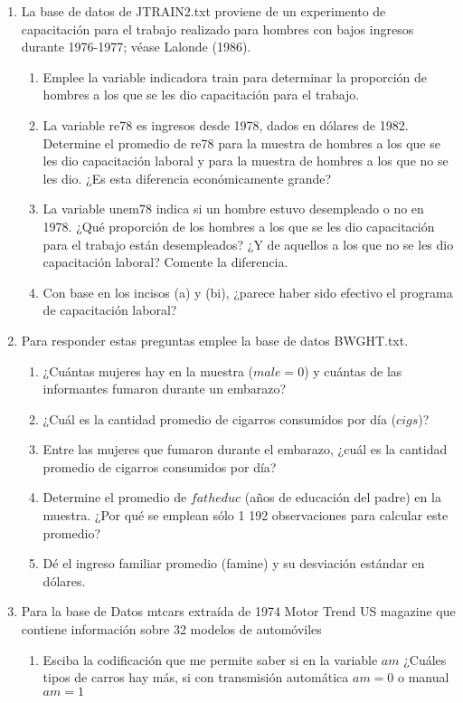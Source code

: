 \documentclass[12pt]{article} %
\begin{document}
\begin{enumerate}
\item La base de datos de JTRAIN2.txt proviene de un experimento de capacitación para el trabajo realizado para hombres con bajos ingresos durante 1976-1977; véase Lalonde (1986).
\begin{enumerate}
\item Emplee la variable indicadora train para determinar la proporción de hombres a los que
se les dio capacitación para el trabajo.
\item La variable re78 es ingresos desde 1978, dados en dólares de 1982. Determine el promedio de re78 para la muestra de hombres a los que se les dio capacitación laboral y para la muestra de hombres a los que no se les dio. ¿Es esta diferencia económicamente grande?
\item La variable unem78 indica si un hombre estuvo desempleado o no en 1978. ¿Qué proporción de los hombres a los que se les dio capacitación para el trabajo están desempleados? ¿Y de aquellos a los que no se les dio capacitación laboral? Comente la diferencia.
\item Con base en los incisos (a) y (bi), ¿parece haber sido efectivo el programa de capacitación laboral? 
\end{enumerate}
\item Para responder estas preguntas emplee la base de datos BWGHT.txt.
\begin{enumerate}
\item ¿Cuántas mujeres hay en la muestra ($male=0$) y cuántas de las informantes fumaron durante un embarazo?
\item ¿Cuál es la cantidad promedio de cigarros consumidos por día ($cigs$)? 
\item Entre las mujeres que fumaron durante el embarazo, ¿cuál es la cantidad promedio de cigarros consumidos por día? 
\item Determine el promedio de $fatheduc$ (años de educación del padre) en la muestra. ¿Por qué se emplean sólo 1 192 observaciones para calcular este promedio?
\item Dé el ingreso familiar promedio (famine) y su desviación estándar en dólares.
\end{enumerate}
\item Para la base de Datos mtcars extraída de 1974 Motor Trend US magazine que contiene información sobre 32 modelos de automóviles
\begin{enumerate}
\item Esciba la codificación que me permite saber si en la variable $am$ ¿Cuáles tipos de carros hay más, si con transmisión automática $am=0$ o manual $am=1$

\end{enumerate}
\end{enumerate}
\end{document}

